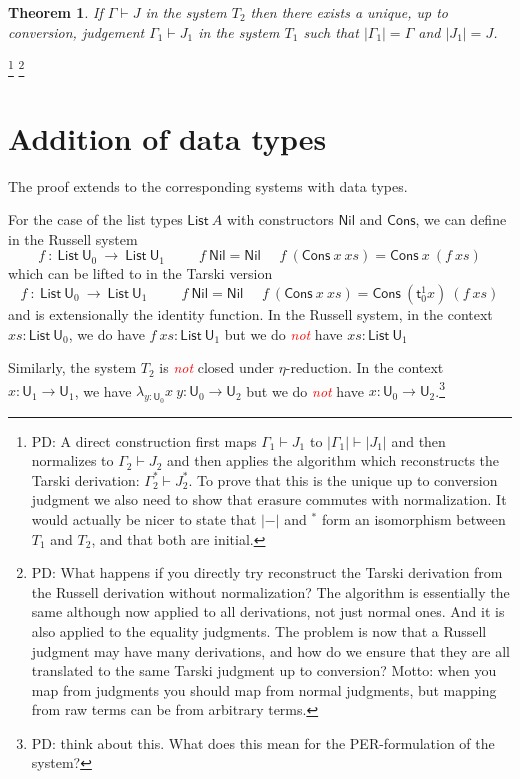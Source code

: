 \documentclass[11pt,a4paper]{article}
\newtheorem{theorem}{Theorem}[section]
\theoremstyle{definition}
\def\UU{\mathsf{U}}
\def\List{\mathsf{List}}
\def\Cons{\mathsf{Cons}}
\def\Nil{\mathsf{Nil}}
\newcommand{\sT}{\mathsf{t}}
\newcommand{\EMP}[1]{\emph{\textcolor{red}{#1}}}
\begin{document}
\begin{theorem}
  If $\Gamma\vdash J$ in the system $T_2$ then there exists a unique, up to conversion, judgement $\Gamma_1\vdash J_1$
  in the system $T_1$ such that $|\Gamma_1| = \Gamma$ and $|J_1| = J$.
\end{theorem}
\footnote{PD:  A direct construction first maps $\Gamma_1\vdash J_1$ to $|\Gamma_1|\vdash |J_1|$ and then normalizes to $\Gamma_2 \vdash J_2$ and then applies the algorithm which reconstructs the Tarski derivation: $\Gamma_2^*\vdash J_2^*$. To prove that this is the unique up to conversion judgment we also need to show that erasure commutes with normalization. It would actually be nicer to state that $|-|$ and $^*$ form an isomorphism between $T_1$ and $T_2$, and that both are initial.}
\footnote{PD: What happens if you directly try reconstruct the Tarski derivation from the Russell derivation without normalization? The algorithm is essentially the same although now applied to all derivations, not just normal ones. And it is also applied to the equality judgments. The problem is now that a Russell judgment may have many derivations, and how do we ensure that they are all translated to the same Tarski judgment up to conversion?  Motto: when you map from judgments you should map from normal judgments, but mapping from raw terms can be from arbitrary terms.}

\section{Addition of data types}

The proof extends to the corresponding systems with data types.

For the case of the list types $\List~A$ with constructors $\Nil$ and $\Cons$, we can define in the Russell system
$$
f~:~\List~\UU_0~\rightarrow~\List~\UU_1~~~~~~~~~~~
f~\Nil = \Nil~~~~~~f~(\Cons~x~xs) = \Cons~x~(f~xs)
$$
which can be lifted to in the Tarski version
$$
f~:~\List~\UU_0~\rightarrow~\List~\UU_1~~~~~~~~~~~
f~\Nil = \Nil~~~~~~f~(\Cons~x~xs) = \Cons~(\sT_0^1 x)~(f~xs)
$$
and is extensionally the identity function.
In the Russell system, in the context  $xs:\List~\UU_0$,
we do have $f~xs:\List~\UU_1$ but we do \EMP{not} have $xs:\List~\UU_1$

\medskip

     Similarly, the system $T_2$ is \EMP{not} closed under $\eta$-reduction. In the context
     $x:\UU_1\rightarrow\UU_1$, 
     we have $\lambda_{y:\UU_0}x~y:\UU_0\rightarrow\UU_2$ but we do \EMP{not} have
     $x:\UU_0\rightarrow\UU_2$.\footnote{PD: think about this. What does this mean for the PER-formulation of the system?}
\end{document}
